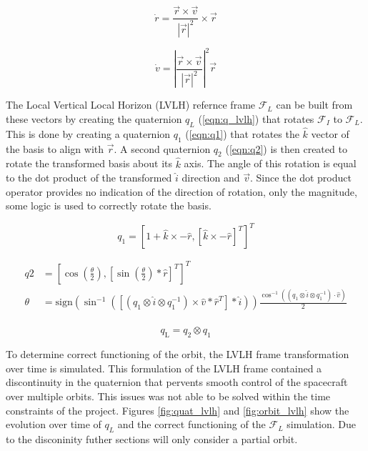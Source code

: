 \documentclass{article}
\begin{document}
\begin{equation}
	\dot{r} = \frac{\vec{r} \times \vec{v}}{|\vec{r}|^2} \times \vec{r}
	\label{eqn:kin_orbit}
\end{equation}

\begin{equation}
	\dot{v} = \left|\frac{\vec{r} \times \vec{v}}{|\vec{r}|^2}\right|^2 \vec{r} 
	\label{eqn:dyn_orbit}
\end{equation}

The Local Vertical Local Horizon (LVLH) refernce frame $\mathcal{F}_{L}$ can be built from these vectors by creating the quaternion $q_{L}$ (\ref{eqn:q_lvlh}) that rotates $\mathcal{F}_I$ to $\mathcal{F}_{L}$. This is done by creating a quaternion $q_1$ (\ref{eqn:q1}) that rotates the $\hat{k}$ vector of the basis to align with $\vec{r}$. A second quaternion $q_2$ (\ref{eqn:q2}) is then created to rotate the transformed basis about its $\hat{k}$ axis. The angle of this rotation is equal to the dot product of the transformed $\hat{i}$ direction and $\vec{v}$. Since the dot product operator provides no indication of the direction of rotation, only the magnitude, some logic is used to correctly rotate the basis.

\begin{equation}
	q_1 = [1 + \hat{k} \times -\hat{r}, [\hat{k} \times -\hat{r}]^T]^T
	\label{eqn:q1}
\end{equation} 

\begin{equation}
\begin{aligned}
	q2 &= \left[\cos\left(\frac{\theta}{2}\right), \left[\sin\left(\frac{\theta}{2}\right) * \hat{r}\right]^T\right]^T \\
	\theta &= \textrm{sign}\left(\sin^{-1}\left(\left[\left(q_1 \otimes \hat{i} \otimes q_1^{-1}\right) \times \hat{v} * \hat{r}^T\right] * \hat{i}\right)\right)\frac{\cos^{-1}\left(\left(q_1 \otimes \hat{i} \otimes q_1^{-1}\right) \cdot \hat{v}\right)}{2} \\ \end{aligned}
	\label{eqn:q2}
\end{equation}

\begin{equation}
	q_{\textrm{L}} = q_2 \otimes q_1
	\label{eqn:q_lvlh}
\end{equation}

To determine correct functioning of the orbit, the LVLH frame transformation over time is simulated. This formulation of the LVLH frame contained a discontinuity in the quaternion that pervents smooth control of the spacecraft over multiple orbits. This issues was not able to be solved within the time constraints of the project. Figures \ref{fig:quat_lvlh} and \ref{fig:orbit_lvlh} show the evolution over time of $q_L$ and the correct functioning of the $\mathcal{F}_L$ simulation. Due to the disconinity futher sections will only consider a partial orbit.
\end{document}
